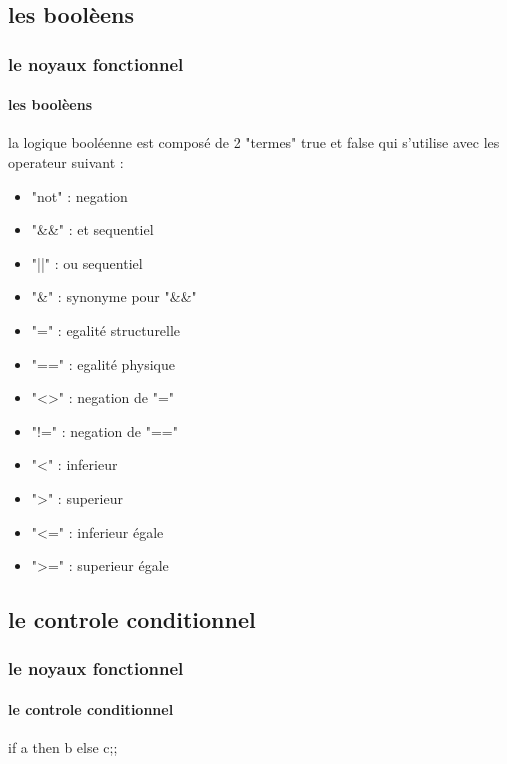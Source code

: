   \subsection{les boolèens}
  \begin{frame}
    \frametitle{le noyaux fonctionnel}
    \framesubtitle{les boolèens}
      la logique booléenne est composé de 2 "termes" true et false qui s'utilise avec les operateur suivant :
      \begin{center}
      \begin{minipage}[t]{7cm}
	  \begin{itemize}
	    \item "not" : negation
	    \item "\&\&" : et sequentiel
	    \item "||" : ou sequentiel
	    \item "\&" : synonyme pour "\&\&"
	  \end{itemize}
	\end{minipage}
      \end{center}
	\begin{minipage}[t]{5cm}
	  \begin{itemize}
	    \item "=" : egalité structurelle
	    \item "==" : egalité physique
	    \item "<>" : negation de "="
	    \item "!=" : negation de "=="
	  \end{itemize}
	\end{minipage}
	\begin{minipage}[t]{5cm}
	  \begin{itemize}
	    \item "<" : inferieur 
	    \item ">" : superieur
	    \item "<=" : inferieur égale
	    \item ">=" : superieur égale
	  \end{itemize}
	\end{minipage}
    \end{frame}

    \subsection{le controle conditionnel}
    \begin{frame}
      \frametitle{le noyaux fonctionnel}
      \framesubtitle{le controle conditionnel}
      if a then b else c;;
    \end{frame}

